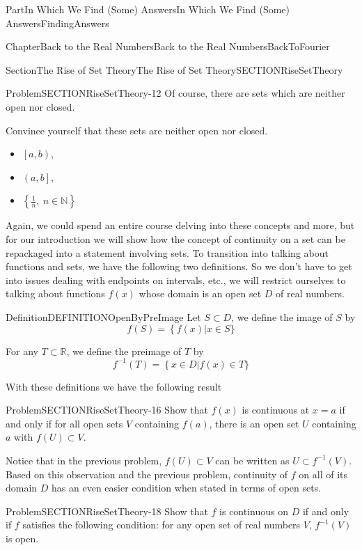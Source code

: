 \documentclass[oneside,10pt,]{book}
\numberwithin{equation}{part}
\newcommand{\NN}{\mathbb {N}}
\begin{document}
\begin{partptx}{Part}{In Which We Find (Some) Answers}{}{In Which We Find (Some) Answers}{}{}{FindingAnswers}
\begin{chapterptx}{Chapter}{Back to the Real Numbers}{}{Back to the Real Numbers}{}{}{BackToFourier}
\begin{sectionptx}{Section}{The Rise of Set Theory}{}{The Rise of Set Theory}{}{}{SECTIONRiseSetTheory}
\begin{problem}{Problem}{}{SECTIONRiseSetTheory-12}
Of course, there are sets which are neither open nor closed.%
\par
Convince yourself that these sets are neither open nor closed.%
\begin{itemize}[label=\textbullet]
\item{}\(\left[a,b\right)\),%
\item{}\(\left(a,b\right]\),%
\item{}\(\displaystyle \left\{\frac{1}{n},\ n\in \NN\right\}\)%
\end{itemize}
%
\end{problem}
Again, we could spend an entire course delving into these concepts and more, but for our introduction we will show how the concept of continuity on a set can be repackaged into a statement involving sets.  To transition into talking about functions and sets, we have the following two definitions.  So we don't have to get into issues dealing with endpoints on intervals, etc., we will restrict ourselves to talking about functions \(f(x)\) whose domain is an open set \(D\) of real numbers.%
\begin{definition}{Definition}{}{DEFINITIONOpenByPreImage}%
Let \(S\subset D\), we define the image of \(S\) by%
\begin{equation*}
f\left(S\right)=\left\{f\left(x\right)\right|x\in S\}
\end{equation*}
%
\par
For any \(T\subset \mathbb{R}\), we define the preimage of \(T\) by%
\begin{equation*}
f^{-1}\left(T\right)=\left\{x\in D\right|f\left(x\right)\in T\}
\end{equation*}
%
\end{definition}
With these definitions we have the following result%
\begin{problem}{Problem}{}{SECTIONRiseSetTheory-16}%
Show that \(f\left(x\right)\) is continuous at \(x=a\) if and only if for all open sets \(V\) containing \(f(a)\), there is an open set \(U\) containing \(a\) with \(f\left(U\right)\subset V\).%
\end{problem}
Notice that in the previous problem, \(f\left(U\right)\subset
V\) can be written as \(U\subset f^{-1}(V)\).  Based on this observation and the previous problem, continuity of \(f\) on all of its domain \(D\) has an even easier condition when stated in terms of open sets.%
\begin{problem}{Problem}{}{SECTIONRiseSetTheory-18}%
Show that \(f\) is continuous on \(D\) if and only if \(f\) satisfies the following condition: for any open set of real numbers \(V\), \(f^{-1}(V)\) is open.%

\end{problem}
\end{sectionptx}
\end{chapterptx}
\end{partptx}
\end{document}
